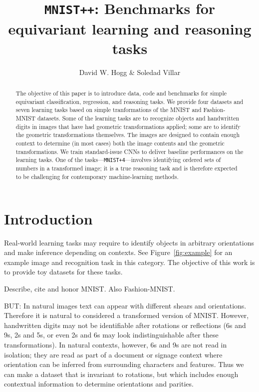 \documentclass{article}
\title{\bfseries \texttt{MNIST++}: Benchmarks for equivariant learning and reasoning tasks}
\author{David W. Hogg \& Soledad Villar}
\date{}
\begin{document}
\maketitle

\begin{abstract}\noindent
    The objective of this paper is to introduce data, code and benchmarks for simple equivariant classification, regression, and reasoning tasks.
    We provide four datasets and seven learning tasks based on simple tranformations of the MNIST and Fashion-MNIST datasets.
    Some of the learning tasks are to recognize objects and handwritten digits in images that have had geometric transformations applied; some are to identify the geometric transformations themselves.
    The images are designed to contain enough context to determine (in most cases) both the image contents and the geometric transformations.
    We train standard-issue CNNs to deliver baseline performances on the learning tasks.
    One of the tasks---\texttt{MNIST+4}---involves identifying ordered sets of numbers in a transformed image; it is a true reasoning task and is therefore expected to be challenging for contemporary machine-learning methods.
\end{abstract}

\section{Introduction}

Real-world learning tasks may require to identify objects in arbitrary orientations and make inference depending on contexts. 
See Figure~\ref{fig:example} for an example image and recognition task in this category.
The objective of this work is to provide toy datasets for these tasks. 

Describe, cite and honor MNIST. Also Fashion-MNIST.

BUT: In natural images text can appear with different shears and orientations.
Therefore it is natural to considered a transformed version of MNIST. However, handwritten digits may not be identifiable after rotations or reflections (6s and 9s, 2s and 5s, or even 2s and 6s may look indistinguishable after these transformations).
In natural contexts, however, 6s and 9s are not read in isolation; they are read as part of a document or signage context where orientation can be inferred from surrounding characters and features.
Thus we can make a dataset that is invariant to rotations, but which includes enough contextual information to determine orientations and parities.
\end{document}
